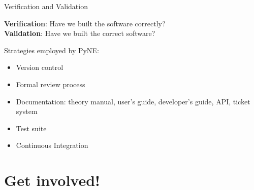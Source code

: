 \documentclass[xcolor=x11names,compress]{beamer}
\renewcommand{\(}{\begin{columns}}
\renewcommand{\)}{\end{columns}}
\newcommand{\<}[1]{\begin{column}{#1}}
\renewcommand{\>}{\end{column}}
\begin{document}
\begin{frame}{Verification and Validation}

    \textbf{Verification}: Have we built the software correctly?\\
    \textbf{Validation}: Have we built the correct software?
    
    \vspace*{1 em}
    Strategies employed by PyNE:
   
    \begin{itemize}
    \item Version control
    \item Formal review process
    \item Documentation: theory manual, user's guide, developer's guide, API, 
    ticket system
    \item Test suite
    \item Continuous Integration
    \end{itemize}

\end{frame}

\section{Get involved!}
%
%
%
\end{document}
